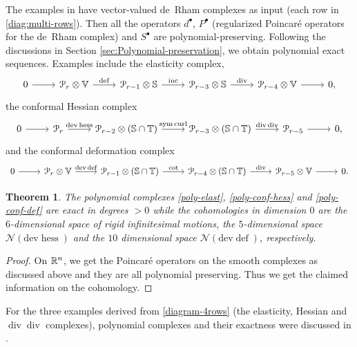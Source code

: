 \documentclass[11pt]{amsart}
\newtheorem{theorem}{Theorem}
\newcommand{\0}{\mathaccent23}
\newcommand\inc{\operatorname{inc}}
\newcommand\sym{\operatorname{sym}}
\newcommand\deff{\operatorname{def}}
\renewcommand\div{\operatorname{div}}
\renewcommand\ker{\mathcal{N}}
\newcommand\curl{\operatorname{curl}}
\newcommand\dev{\mathrm{dev}}
\newcommand\hess{\operatorname{hess}}
\newcommand{\bs}{{\scriptscriptstyle \bullet}}
\begin{document}
 
The examples in \cite{vcap2022bgg} have vector-valued de~Rham complexes as input (each row in \eqref{diag:multi-rows}). Then all the operators $d^{\bs}$, $P^{\bs}$ (regularized Poincar\'e operators for the de~Rham complex) and $S^{\bs}$ are polynomial-preserving. Following the discussions in Section \ref{sec:Polynomial-preservation}, we obtain polynomial exact sequences. Examples include the elasticity complex,
   \begin{equation}\label{poly-elast} 
\begin{tikzcd}
  0 \arrow{r}& \mathcal{P}_{r}\otimes \mathbb{V}\arrow{r}{\deff}& \mathcal{P}_{r-1}\otimes \mathbb{S}\arrow{r}{\inc }& \mathcal{P}_{r-3}\otimes \mathbb{S} \arrow{r}{\div }&\mathcal{P}_{r-4}\otimes \mathbb{V} \arrow{r}&0,
\end{tikzcd}
\end{equation}
the conformal Hessian complex
   \begin{equation} \label{poly-conf-hess}
\begin{tikzcd}
  0 \arrow{r}& \mathcal{P}_{r} \arrow{r}{\dev\hess}& \mathcal{P}_{r-2}\otimes (\mathbb{S}\cap \mathbb{T})\arrow{r}{\sym\curl }& \mathcal{P}_{r-3}\otimes  (\mathbb{S}\cap \mathbb{T}) \arrow{r}{\div\div }&\mathcal{P}_{r-5}\arrow{r}&0,
\end{tikzcd}
\end{equation}
and the conformal deformation complex
   \begin{equation} \label{poly-conf-def}
\begin{tikzcd}
 0 \arrow{r}& \mathcal{P}_{r}\otimes \mathbb{V}  \arrow{r}{\dev\deff}& \mathcal{P}_{r-1}\otimes (\mathbb{S}\cap \mathbb{T})\arrow{r}{\cot }& \mathcal{P}_{r-4}\otimes  (\mathbb{S}\cap \mathbb{T}) \arrow{r}{ \div }&\mathcal{P}_{r-5}\otimes \mathbb{V} \arrow{r}&0.
\end{tikzcd}
   \end{equation}
\begin{theorem}
The polynomial complexes  \eqref{poly-elast}, \eqref{poly-conf-hess} and \eqref{poly-conf-def} are exact in degrees $>0$ while the cohomologies in dimension $0$ are the $6$-dimensional space of rigid infinitesimal motions, the $5$-dimensional space $\ker(\dev\hess)$ and the $10$ dimensional space $\ker(\dev\deff)$, respectively.
\end{theorem}
 \begin{proof}
On $\Bbb R^n$, we get the Poincar\'e operators on the smooth complexes as discussed above and they are all polynomial preserving. Thus we get the claimed information on the cohomology.  
\end{proof}
For the three examples derived from \eqref{diagram-4rows} (the elasticity, Hessian and $\div\div$ complexes), polynomial complexes and their exactness were discussed in \cite{chen2022discrete,chen2022finite-divdiv,chen2022finite,christiansen2020poincare}. %
\end{document}
